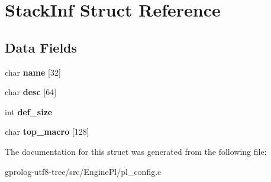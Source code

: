 \hypertarget{structStackInf}{}\section{Stack\+Inf Struct Reference}
\label{structStackInf}
\subsection*{Data Fields}
\begin{DoxyCompactItemize}
\item 
char {\bfseries name} \mbox{[}32\mbox{]}\hypertarget{structStackInf_a9f47cfd7dc989579d8e449ac821130ce}{}\label{structStackInf_a9f47cfd7dc989579d8e449ac821130ce}

\item 
char {\bfseries desc} \mbox{[}64\mbox{]}\hypertarget{structStackInf_a6719b7ffffaa34f3a5c973e06369e9b3}{}\label{structStackInf_a6719b7ffffaa34f3a5c973e06369e9b3}

\item 
int {\bfseries def\+\_\+size}\hypertarget{structStackInf_a58879eae3bfda4bb51d864f58ba32b8f}{}\label{structStackInf_a58879eae3bfda4bb51d864f58ba32b8f}

\item 
char {\bfseries top\+\_\+macro} \mbox{[}128\mbox{]}\hypertarget{structStackInf_aecd772924d9909d2875259c5aedc5bc9}{}\label{structStackInf_aecd772924d9909d2875259c5aedc5bc9}

\end{DoxyCompactItemize}


The documentation for this struct was generated from the following file\+:\begin{DoxyCompactItemize}
\item 
gprolog-\/utf8-\/tree/src/\+Engine\+Pl/pl\+\_\+config.\+c\end{DoxyCompactItemize}
